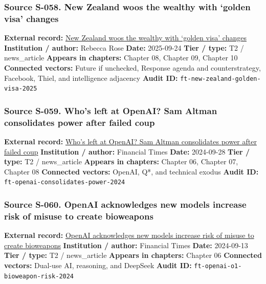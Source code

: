 \documentclass[
  american,
  11pt,
  letterpaper,
]{article}
\begin{document}
\subsubsection{Source S-058. New Zealand woos the wealthy with `golden
visa'
changes}\label{source-s-058-new-zealand-woos-the-wealthy-with-golden-visa-changes}

\textbf{External record:}
\href{https://www.ft.com/content/76ca455c-3b16-4413-8738-3f17431d125b}{New
Zealand woos the wealthy with `golden visa' changes} \textbf{Institution
/ author:} Rebecca Rose \textbf{Date:} 2025-09-24 \textbf{Tier / type:}
T2 / news\_article \textbf{Appears in chapters:} Chapter 08, Chapter 09,
Chapter 10 \textbf{Connected vectors:} Future if unchecked, Response
agenda and counterstrategy, Facebook, Thiel, and intelligence adjacency
\textbf{Audit ID:} \texttt{ft-new-zealand-golden-visa-2025}

\subsubsection{Source S-059. Who's left at OpenAI? Sam Altman
consolidates power after failed
coup}\label{source-s-059-who-s-left-at-openai-sam-altman-consolidates-power-after-failed-coup}

\textbf{External record:}
\href{https://www.ft.com/content/85d6ff56-89f1-4720-bc2f-dceb82402c4e}{Who's
left at OpenAI? Sam Altman consolidates power after failed coup}
\textbf{Institution / author:} Financial Times \textbf{Date:} 2024-09-28
\textbf{Tier / type:} T2 / news\_article \textbf{Appears in chapters:}
Chapter 06, Chapter 07, Chapter 08 \textbf{Connected vectors:} OpenAI,
Q*, and technical exodus \textbf{Audit ID:}
\texttt{ft-openai-consolidates-power-2024}

\subsubsection{Source S-060. OpenAI acknowledges new models increase
risk of misuse to create
bioweapons}\label{source-s-060-openai-acknowledges-new-models-increase-risk-of-misuse-to-create-bioweapons}

\textbf{External record:}
\href{https://www.ft.com/content/37ba7236-2a64-4807-b1e1-7e21ee7d0914}{OpenAI
acknowledges new models increase risk of misuse to create bioweapons}
\textbf{Institution / author:} Financial Times \textbf{Date:} 2024-09-13
\textbf{Tier / type:} T2 / news\_article \textbf{Appears in chapters:}
Chapter 06 \textbf{Connected vectors:} Dual-use AI, reasoning, and
DeepSeek \textbf{Audit ID:} \texttt{ft-openai-o1-bioweapon-risk-2024}
\end{document}
